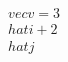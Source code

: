 \documentclass[preview]{standalone}
\begin{document}
\begin{align*}
\quad\\vec{v} = 3\quad\\hat{i} + 2\quad\\hat{j}
\end{align*}
\end{document}
